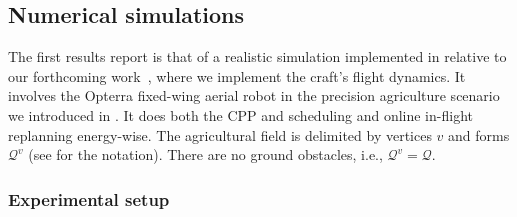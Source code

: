 \subsection{Numerical simulations}
\label{sec:res-num-simu}

The first results report is that of a realistic simulation implemented in \matlab relative to our forthcoming work~\citep{seewald202Xenergy}, where we implement the craft's flight dynamics. It involves the Opterra fixed-wing aerial robot in the precision agriculture scenario we introduced in . It does both the CPP and scheduling and online in-flight replanning energy-wise. The agricultural field is delimited by vertices $v$ and forms $\mathcal{Q}^v$ (see  for the notation). There are no ground obstacles, i.e., $\mathcal{Q}^v=\mathcal{Q}$.

\subsubsection*{Experimental setup}

